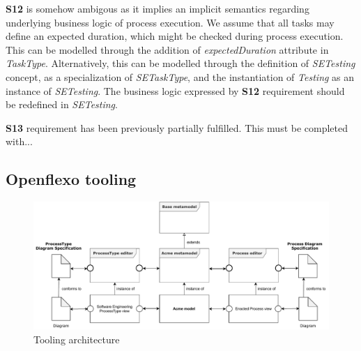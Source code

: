 \textbf{S12} is somehow ambigous as it implies an implicit semantics regarding underlying business logic of process execution. We assume that all tasks may define an expected duration, which might be checked during process execution. This can be modelled through the addition of \textit{expectedDuration} attribute in \textit{TaskType}. Alternatively, this can be modelled through the definition of \textit{SETesting} concept, as a specialization of \textit{SETaskType}, and the instantiation of \textit{Testing} as an instance of \textit{SETesting}. The business logic expressed by \textbf{S12} requirement should be redefined in \textit{SETesting}.

\textbf{S13} requirement has been previously partially fulfilled. This must be completed with...


\subsection{Openflexo tooling}

\begin{figure}
 \centering
     \includegraphics[width=0.9 \textwidth]{Figures/ToolingArchitecture.pdf}
     \caption{Tooling architecture}
    \label{fig:ToolingArchitecture}
\end{figure}



